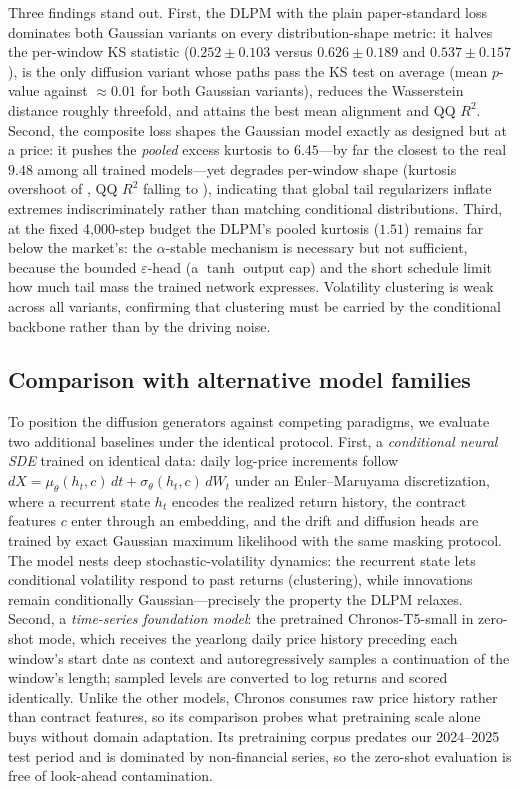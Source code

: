\documentclass[12pt,letterpaper]{article}
\newcommand{\rSimKS}{$0.626 \pm 0.189$}     \newcommand{\rCpxKS}{$0.537 \pm 0.157$}     \newcommand{\rDlpmKS}{$0.252 \pm 0.103$}
\newcommand{\poolKurtReal}{$9.48$} \newcommand{\poolKurtSim}{$3.19$} \newcommand{\poolKurtCpx}{$6.45$} \newcommand{\poolKurtDlpm}{$1.51$}
\begin{document}
Three findings stand out. First, the DLPM with the plain paper-standard
loss dominates both Gaussian variants on every distribution-shape metric:
it halves the per-window KS statistic (\rDlpmKS{} versus \rSimKS{} and
\rCpxKS{}), is the only diffusion variant whose paths pass the KS test on
average (mean $p$-value \rDlpmKSp{} against $\approx 0.01$ for both
Gaussian variants), reduces the Wasserstein distance roughly threefold, and
attains the best mean alignment and QQ $R^2$. Second, the composite loss
shapes the Gaussian model exactly as designed but at a price: it pushes the
\emph{pooled} excess kurtosis to \poolKurtCpx{}---by far the closest to the
real \poolKurtReal{} among all trained models---yet degrades per-window
shape (kurtosis overshoot of \rCpxKurt{}, QQ $R^2$ falling to \rCpxQQ{}),
indicating that global tail regularizers inflate extremes indiscriminately
rather than matching conditional distributions. Third, at the fixed
4{,}000-step budget the DLPM's pooled kurtosis (\poolKurtDlpm{}) remains
far below the market's: the $\alpha$-stable mechanism is necessary but not
sufficient, because the bounded $\varepsilon$-head (a $\tanh$ output cap)
and the short schedule limit how much tail mass the trained network
expresses. Volatility clustering is weak across all variants, confirming
that clustering must be carried by the conditional backbone rather than by
the driving noise.

\subsection{Comparison with alternative model families}\label{sec:baselines}

To position the diffusion generators against competing paradigms, we
evaluate two additional baselines under the identical protocol. First, a
\emph{conditional neural SDE} \citep{gierjatowicz2020neural} trained on
identical data: daily log-price increments follow
$dX = \mu_\theta(h_t, c)\,dt + \sigma_\theta(h_t, c)\,dW_t$ under an
Euler--Maruyama discretization, where a recurrent state $h_t$ encodes the
realized return history, the contract features $c$ enter through an
embedding, and the drift and diffusion heads are trained by exact Gaussian
maximum likelihood with the same masking protocol. The model nests deep
stochastic-volatility dynamics: the recurrent state lets conditional
volatility respond to past returns (clustering), while innovations remain
conditionally Gaussian---precisely the property the DLPM relaxes. Second, a
\emph{time-series foundation model}: the pretrained Chronos-T5-small
\citep{ansari2024chronos} in zero-shot mode, which receives the yearlong
daily price history preceding each window's start date as context and
autoregressively samples a continuation of the window's length; sampled
levels are converted to log returns and scored identically. Unlike the
other models, Chronos consumes raw price history rather than contract
features, so its comparison probes what pretraining scale alone buys
without domain adaptation. Its pretraining corpus predates our 2024--2025
test period and is dominated by non-financial series, so the zero-shot
evaluation is free of look-ahead contamination.
\end{document}
